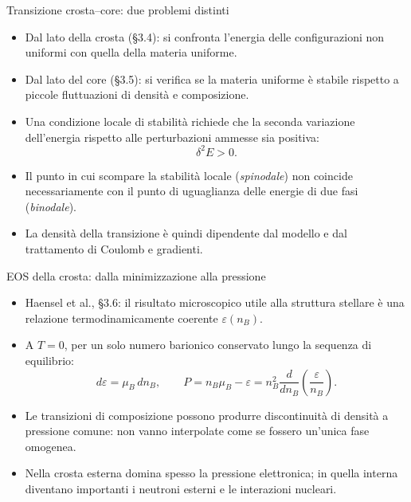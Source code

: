 \begin{frame}[t]{Transizione crosta--core: due problemi distinti}
\small
\begin{itemize}
\item Dal lato della crosta (\S3.4): si confronta l'energia delle configurazioni non uniformi con quella della materia uniforme.
\item Dal lato del core (\S3.5): si verifica se la materia uniforme è stabile rispetto a piccole fluttuazioni di densità e composizione.
\item Una condizione locale di stabilità richiede che la seconda variazione dell'energia rispetto alle perturbazioni ammesse sia positiva:
\[
\delta^2 E>0.
\]
\item Il punto in cui scompare la stabilità locale (\emph{spinodale}) non coincide necessariamente con il punto di uguaglianza delle energie di due fasi (\emph{binodale}).
\item La densità della transizione è quindi dipendente dal modello e dal trattamento di Coulomb e gradienti.
\end{itemize}
\end{frame}

\begin{frame}[t]{EOS della crosta: dalla minimizzazione alla pressione}
\small
\begin{itemize}
\item Haensel et al., \S3.6: il risultato microscopico utile alla struttura stellare è una relazione termodinamicamente coerente \(\varepsilon(n_B)\).
\item A \(T=0\), per un solo numero barionico conservato lungo la sequenza di equilibrio:
\[
d\varepsilon=\mu_B\,dn_B,\qquad
P=n_B\mu_B-\varepsilon
=n_B^2\frac{d}{dn_B}\left(\frac{\varepsilon}{n_B}\right).
\]
\item Le transizioni di composizione possono produrre discontinuità di densità a pressione comune: non vanno interpolate come se fossero un'unica fase omogenea.
\item Nella crosta esterna domina spesso la pressione elettronica; in quella interna diventano importanti i neutroni esterni e le interazioni nucleari.
\end{itemize}
\end{frame}


